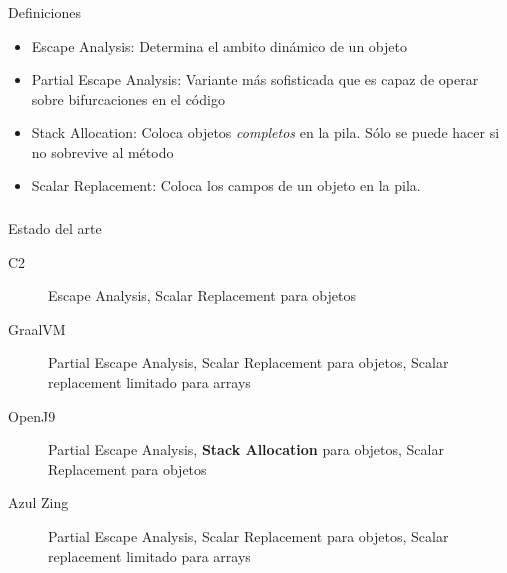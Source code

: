 \begin{frame}[fragile]
  \frametitle{\ft}
  \begin{block}{Definiciones}
    \begin{itemize}
    \item Escape Analysis: Determina el ambito dinámico de un objeto
    \item Partial Escape Analysis: Variante más sofisticada que es capaz de
      operar sobre bifurcaciones en el código
    \item Stack Allocation: Coloca objetos {\it completos} en la pila.
      Sólo se puede hacer si no sobrevive al método
    \item Scalar Replacement: Coloca los campos de un objeto en la pila.
    \end{itemize}
  \end{block}
\end{frame}


\begin{frame}[fragile]
  \frametitle{\ft}
  \begin{block}{Estado del arte}
    \begin{description}
    \item[C2]
      Escape Analysis,
      Scalar Replacement para objetos
    \item[GraalVM]
      Partial Escape Analysis,
      Scalar Replacement para objetos,
      Scalar replacement limitado para arrays
    \item[OpenJ9]
      Partial Escape Analysis,
      {\bf Stack Allocation} para objetos,
      Scalar Replacement para objetos
    \item[Azul Zing]
      Partial Escape Analysis,
      Scalar Replacement para objetos,
      Scalar replacement limitado para arrays
    \end{description}
  \end{block}
\end{frame}
